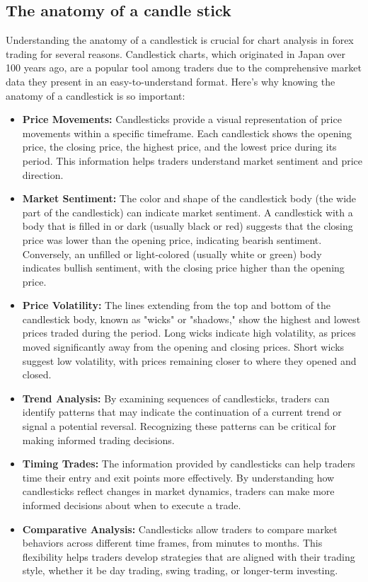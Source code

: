 \documentclass{report}
\begin{document}
     \subsection{The anatomy of a candle stick}
     \bigbreak \noindent 
     Understanding the anatomy of a candlestick is crucial for chart analysis in forex trading for several reasons. Candlestick charts, which originated in Japan over 100 years ago, are a popular tool among traders due to the comprehensive market data they present in an easy-to-understand format. Here's why knowing the anatomy of a candlestick is so important:
     \begin{itemize}
         \item \textbf{Price Movements:} Candlesticks provide a visual representation of price movements within a specific timeframe. Each candlestick shows the opening price, the closing price, the highest price, and the lowest price during its period. This information helps traders understand market sentiment and price direction.
         \item \textbf{Market Sentiment:} The color and shape of the candlestick body (the wide part of the candlestick) can indicate market sentiment. A candlestick with a body that is filled in or dark (usually black or red) suggests that the closing price was lower than the opening price, indicating bearish sentiment. Conversely, an unfilled or light-colored (usually white or green) body indicates bullish sentiment, with the closing price higher than the opening price.
         \item \textbf{Price Volatility:} The lines extending from the top and bottom of the candlestick body, known as "wicks" or "shadows," show the highest and lowest prices traded during the period. Long wicks indicate high volatility, as prices moved significantly away from the opening and closing prices. Short wicks suggest low volatility, with prices remaining closer to where they opened and closed.
         \item \textbf{Trend Analysis:} By examining sequences of candlesticks, traders can identify patterns that may indicate the continuation of a current trend or signal a potential reversal. Recognizing these patterns can be critical for making informed trading decisions.
         \item \textbf{Timing Trades:} The information provided by candlesticks can help traders time their entry and exit points more effectively. By understanding how candlesticks reflect changes in market dynamics, traders can make more informed decisions about when to execute a trade.
         \item \textbf{Comparative Analysis:} Candlesticks allow traders to compare market behaviors across different time frames, from minutes to months. This flexibility helps traders develop strategies that are aligned with their trading style, whether it be day trading, swing trading, or longer-term investing.
    \end{itemize}
    \bigbreak \noindent 
\end{document}
